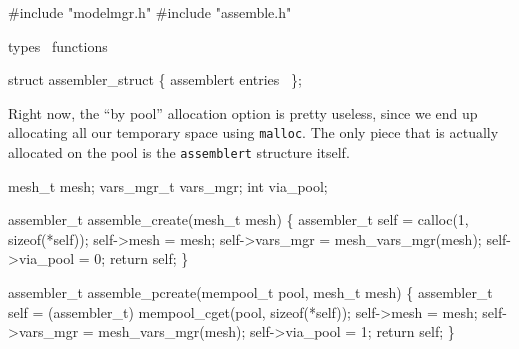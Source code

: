 #include "modelmgr.h"
#include "assemble.h"

\LA{}types~{\nwtagstyle{}}\RA{}
\LA{}functions~{\nwtagstyle{}}\RA{}
\nwendcode{}\nwdocspar

\nwenddocs{}\endmoddef
struct assembler_struct \{
    \LA{}\code{}assembler{}t\edoc{} entries~{\nwtagstyle{}}\RA{}
\};

\nwendcode{}\nwdocspar

Right now, the ``by pool'' allocation option is pretty useless,
since we end up allocating all our temporary space using {\tt{}malloc}.
The only piece that is actually allocated on the pool is the
{\tt{}assembler{}t} structure itself.

\nwenddocs{}\endmoddef
mesh_t     mesh;
vars_mgr_t vars_mgr;
int        via_pool;
\nwendcode{}\nwdocspar

\nwenddocs{}\endmoddef
assembler_t assemble_create(mesh_t mesh)
\{
    assembler_t self = calloc(1, sizeof(*self));
    self->mesh       = mesh;
    self->vars_mgr   = mesh_vars_mgr(mesh);
    self->via_pool   = 0;
    return self;
\}

\nwendcode{}\nwdocspar

\nwenddocs{}\plusendmoddef
assembler_t assemble_pcreate(mempool_t pool, mesh_t mesh)
\{
    assembler_t self = (assembler_t) mempool_cget(pool, sizeof(*self));
    self->mesh       = mesh;
    self->vars_mgr   = mesh_vars_mgr(mesh);
    self->via_pool   = 1;
    return self;
\}

